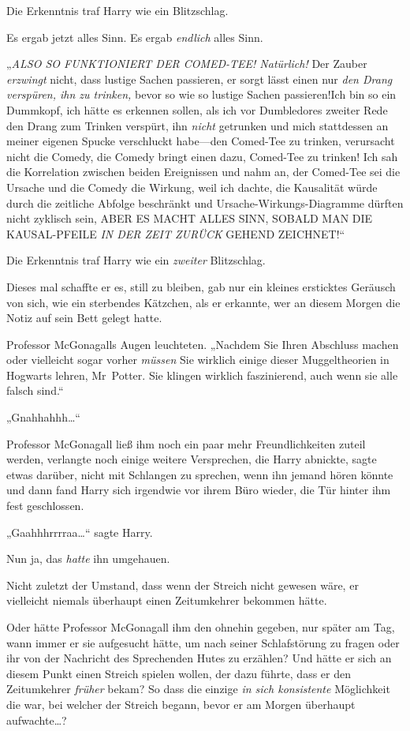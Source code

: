 {Die Erkenntnis traf Harry wie ein Blitzschlag.

Es ergab jetzt alles Sinn. Es ergab \emph{endlich} alles Sinn.

„\emph{ALSO SO FUNKTIONIERT DER COMED-TEE! Natürlich!} Der Zauber \emph{erzwingt} nicht, dass lustige Sachen passieren, er sorgt lässt einen nur \emph{den Drang verspüren, ihn zu trinken,} bevor so wie so lustige Sachen passieren!Ich bin so ein Dummkopf, ich hätte es erkennen sollen, als ich vor Dumbledores zweiter Rede den Drang zum Trinken verspürt, ihn \emph{nicht} getrunken und mich stattdessen an meiner eigenen Spucke verschluckt habe—den Comed-Tee zu trinken, verursacht nicht die Comedy, die Comedy bringt einen dazu, Comed-Tee zu trinken! Ich sah die Korrelation zwischen beiden Ereignissen und nahm an, der Comed-Tee sei die Ursache und die Comedy die Wirkung, weil ich dachte, die Kausalität würde durch die zeitliche Abfolge beschränkt und Ursache-Wirkungs-Diagramme dürften nicht zyklisch sein, ABER ES MACHT ALLES SINN, SOBALD MAN DIE KAUSAL-PFEILE \emph{IN DER ZEIT ZURÜCK} GEHEND ZEICHNET!“

Die Erkenntnis traf Harry wie ein \emph{zweiter} Blitzschlag.

Dieses mal schaffte er es, still zu bleiben, gab nur ein kleines ersticktes Geräusch von sich, wie ein sterbendes Kätzchen, als er erkannte, wer an diesem Morgen die Notiz auf sein Bett gelegt hatte.

Professor McGonagalls Augen leuchteten. „Nachdem Sie Ihren Abschluss machen oder vielleicht sogar vorher \emph{müssen} Sie wirklich einige dieser Muggeltheorien in Hogwarts lehren, Mr~Potter. Sie klingen wirklich faszinierend, auch wenn sie alle falsch sind.“

„Gnahhahhh…“

Professor McGonagall ließ ihm noch ein paar mehr Freundlichkeiten zuteil werden, verlangte noch einige weitere Versprechen, die Harry abnickte, sagte etwas darüber, nicht mit Schlangen zu sprechen, wenn ihn jemand hören könnte und dann fand Harry sich irgendwie vor ihrem Büro wieder, die Tür hinter ihm fest geschlossen.

„Gaahhhrrrraa…“ sagte Harry.

Nun ja, das \emph{hatte} ihn umgehauen.

Nicht zuletzt der Umstand, dass wenn der Streich nicht gewesen wäre, er vielleicht niemals überhaupt einen Zeitumkehrer bekommen hätte.

Oder hätte Professor McGonagall ihm den ohnehin gegeben, nur später am Tag, wann immer er sie aufgesucht hätte, um nach seiner Schlafstörung zu fragen oder ihr von der Nachricht des Sprechenden Hutes zu erzählen? Und hätte er sich an diesem Punkt einen Streich spielen wollen, der dazu führte, dass er den Zeitumkehrer \emph{früher} bekam? So dass die einzige \emph{in sich konsistente} Möglichkeit die war, bei welcher der Streich begann, bevor er am Morgen überhaupt aufwachte…?

}
